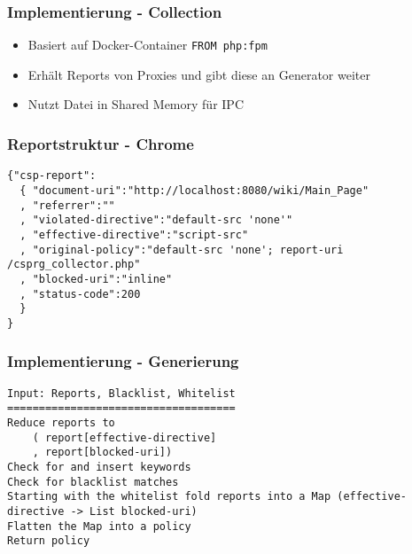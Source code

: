 \documentclass[handout]{beamer}
\begin{document}
\begin{frame}
\frametitle{Implementierung - Collection}
\begin{itemize}
\item Basiert auf Docker-Container \colorbox{verylightgray}{\lstinline[basicstyle=\ttfamily\color{black}]|FROM php:fpm|}
\item Erh\"alt Reports von Proxies und gibt diese an Generator weiter
\item Nutzt Datei in Shared Memory f\"ur IPC
\end{itemize}
\end{frame}

\begin{frame}[fragile]
\frametitle{Reportstruktur - Chrome}
\begin{lstlisting}
{"csp-report":
  { "document-uri":"http://localhost:8080/wiki/Main_Page"
  , "referrer":""
  , "violated-directive":"default-src 'none'"
  , "effective-directive":"script-src"
  , "original-policy":"default-src 'none'; report-uri /csprg_collector.php"
  , "blocked-uri":"inline"
  , "status-code":200
  }
}
\end{lstlisting}
\end{frame}

\begin{frame}[fragile]
\frametitle{Implementierung - Generierung}
\begin{lstlisting}
Input: Reports, Blacklist, Whitelist
====================================
Reduce reports to 
	( report[effective-directive]
	, report[blocked-uri])
Check for and insert keywords
Check for blacklist matches
Starting with the whitelist fold reports into a Map (effective-directive -> List blocked-uri)
Flatten the Map into a policy
Return policy
\end{lstlisting}
\end{frame}
\end{document}
